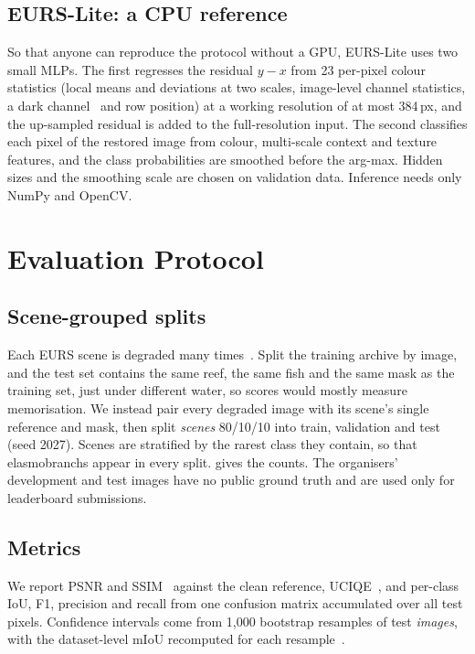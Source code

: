 \documentclass[10pt,twocolumn,letterpaper]{article}
\newcommand{\lite}{EURS-Lite}
\begin{document}
\subsection{\lite{}: a CPU reference}
So that anyone can reproduce the protocol without a GPU, \lite{} uses two small MLPs. The first regresses the
residual $y-x$ from 23 per-pixel colour statistics (local means and deviations at two scales, image-level
channel statistics, a dark channel~\cite{he2011dark} and row position) at a working resolution of at most
384\,px, and the up-sampled residual is added to the full-resolution input. The second classifies each pixel of
the restored image from colour, multi-scale context and texture features, and the class probabilities are
smoothed before the arg-max. Hidden sizes and the smoothing scale are chosen on validation data. Inference
needs only NumPy and OpenCV.

\section{Evaluation Protocol}
\subsection{Scene-grouped splits}
Each EURS scene is degraded many times~\cite{desai2024rsuigm,eurs2027challenge}. Split the training archive by
image, and the test set contains the same reef, the same fish and the same mask as the training set, just
under different water, so scores would mostly measure memorisation. We instead pair every degraded image
with its scene's single reference and mask, then split \emph{scenes} 80/10/10 into train, validation and test
(seed 2027). Scenes are stratified by the rarest class they contain, so that elasmobranchs appear in every
split.  gives the counts. The organisers' development and test images have no public ground
truth and are used only for leaderboard submissions.

\begin{table}[t]
\centering\small
\resizebox{\linewidth}{!}{}
\caption{Scene-grouped split of the EURS training archive.}
\label{tab:split}
\end{table}

\subsection{Metrics}
We report PSNR and SSIM~\cite{wang2004ssim} against the clean reference, UCIQE~\cite{yang2015uciqe}, and per-class
IoU, F1, precision and recall from one confusion matrix accumulated over all test pixels. Confidence intervals
come from 1{,}000 bootstrap resamples of test \emph{images}, with the dataset-level mIoU recomputed for each
resample~\cite{efron1993bootstrap}.
\end{document}

